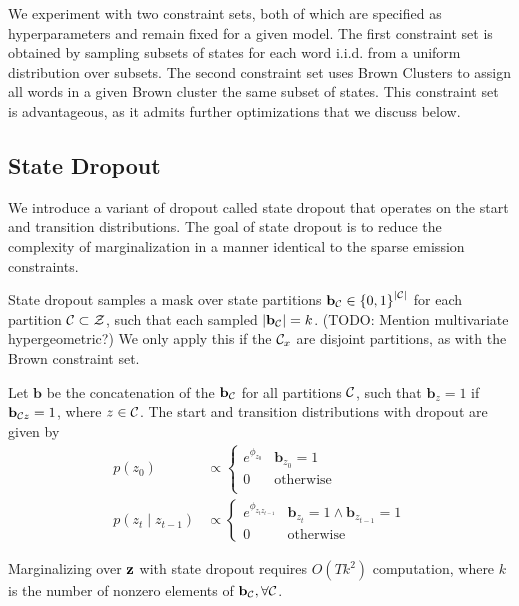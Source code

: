 \documentclass[11pt,a4paper]{article}
\begin{document}
We experiment with two constraint sets, both of which are specified 
as hyperparameters and remain fixed for a given model.
The first constraint set is obtained by sampling subsets of
states for each word i.i.d. from a uniform distribution over subsets.
The second constraint set uses Brown Clusters \citep{brown1992}
to assign all words in a given Brown cluster the same subset of states.
This constraint set is advantageous, as it admits further optimizations
that we discuss below.

\subsection{State Dropout}
We introduce a variant of dropout called state dropout that operates on the
start and transition distributions.
The goal of state dropout is to reduce the complexity of marginalization in a manner
identical to the sparse emission constraints.

State dropout samples a mask over state partitions
$\mathbf{b}_{\mathcal{C}} \in \left\{0,1\right\}^{|\mathcal{C}|}$ for each partition $\mathcal{C} \subset \mathcal{Z}$,
such that each sampled $|\mathbf{b}_{\mathcal{C}}| = k$.
(TODO: Mention multivariate hypergeometric?)
We only apply this if the $\mathcal{C}_x$ are disjoint partitions,
as with the Brown constraint set.

Let $\mathbf{b}$ be the concatenation of the $\mathbf{b}_{\mathcal{C}}$ for all partitions $\mathcal{C}$,
such that $\mathbf{b}_z = 1$ if $\mathbf{b}_{\mathcal{C} z} = 1$, where $z \in \mathcal{C}$.
The start and transition distributions with dropout are given by
\begin{equation}
\label{eqn:state_dropout}
\begin{aligned}
p(z_0) &\propto \begin{cases}
e^{\phi_{z_0}} & \mathbf{b}_{z_0} = 1\\
0 & \textrm{otherwise}\\
\end{cases}\\
p(z_t \mid z_{t-1}) &\propto \begin{cases}
e^{\phi_{z_tz_{t-1}}} & \mathbf{b}_{z_t} = 1 \wedge \mathbf{b}_{z_{t-1}} = 1\\
0 & \textrm{otherwise}
\end{cases}
\end{aligned}
\end{equation}

Marginalizing over $\mathbf{z}$ with state dropout requires $O(Tk^2)$ computation,
where $k$ is the number of nonzero elements of $\mathbf{b}_{\mathcal{C}}, \forall \mathcal{C}$.
\end{document}
